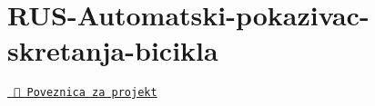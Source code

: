 \chapter{RUS-\/\+Automatski-\/pokazivac-\/skretanja-\/bicikla}
\hypertarget{md__f_1_2_desktop_2_i_t_2_diplomski_22_8_01semestar_2_razvoj_01ugradbenih_01sustava_2_r_u_s-_autf1324a472220271d9256e91fc9d18fab}{}\label{md__f_1_2_desktop_2_i_t_2_diplomski_22_8_01semestar_2_razvoj_01ugradbenih_01sustava_2_r_u_s-_autf1324a472220271d9256e91fc9d18fab}
\label{md__f_1_2_desktop_2_i_t_2_diplomski_22_8_01semestar_2_razvoj_01ugradbenih_01sustava_2_r_u_s-_autf1324a472220271d9256e91fc9d18fab_autotoc_md29}%
%


\href{https://wokwi.com/projects/429320227133652993}{\texttt{ 🔗 Poveznica za projekt}}

 